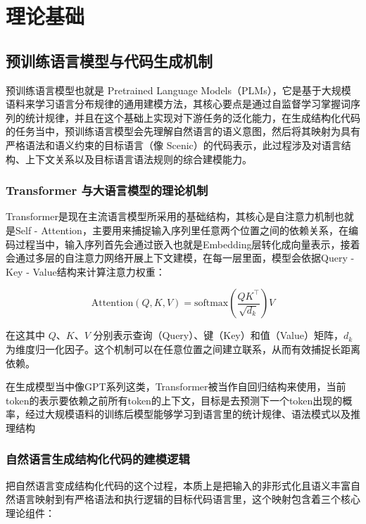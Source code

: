 \chapter{理论基础}

\section{预训练语言模型与代码生成机制}

预训练语言模型也就是 Pretrained Language Models（PLMs），它是基于大规模语料来学习语言分布规律的通用建模方法，其核心要点是通过自监督学习掌握词序列的统计规律，并且在这个基础上实现对下游任务的泛化能力，在生成结构化代码的任务当中，预训练语言模型会先理解自然语言的语义意图，然后将其映射为具有严格语法和语义约束的目标语言（像 Scenic）的代码表示，此过程涉及对语言结构、上下文关系以及目标语言语法规则的综合建模能力。

\subsection{Transformer 与大语言模型的理论机制}

Transformer是现在主流语言模型所采用的基础结构，其核心是自注意力机制也就是Self - Attention，主要用来捕捉输入序列里任意两个位置之间的依赖关系，在编码过程当中，输入序列首先会通过嵌入也就是Embedding层转化成向量表示，接着会通过多层的自注意力网络开展上下文建模，在每一层里面，模型会依据Query - Key - Value结构来计算注意力权重：

\begin{equation}
	\text{Attention}(Q, K, V) = \text{softmax}\left( \frac{QK^\top}{\sqrt{d_k}} \right)V
\end{equation}

在这其中 $Q$、$K$、$V$ 分别表示查询（Query）、键（Key）和值（Value）矩阵，$d_k$ 为维度归一化因子。这个机制可以在任意位置之间建立联系，从而有效捕捉长距离依赖。

在生成模型当中像GPT系列这类，Transformer被当作自回归结构来使用，当前token的表示要依赖之前所有token的上下文，目标是去预测下一个token出现的概率，经过大规模语料的训练后模型能够学习到语言里的统计规律、语法模式以及推理结构

\subsection{自然语言生成结构化代码的建模逻辑}

把自然语言变成结构化代码的这个过程，本质上是把输入的非形式化且语义丰富自然语言映射到有严格语法和执行逻辑的目标代码语言里，这个映射包含着三个核心理论组件：

